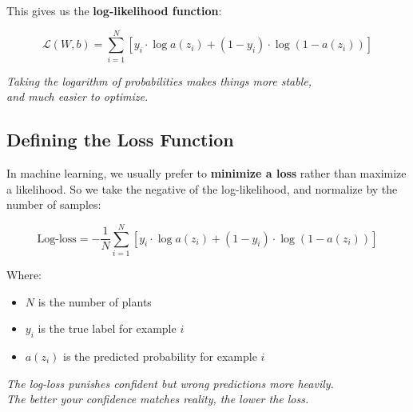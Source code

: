 \documentclass[11pt]{article}
\begin{document}
\vspace{0.5em}

This gives us the \textbf{log-likelihood function}:

\[
\mathcal{L}(W, b) = \sum_{i=1}^{N} \left[ y_i \cdot \log a(z_i) + (1 - y_i) \cdot \log (1 - a(z_i)) \right]
\]

\vspace{0.5em}

\begin{tcolorbox}[colback=gray!8, colframe=gray!40!black, sharp corners=southwest, boxrule=0.3mm]
\centering
\textit{Taking the logarithm of probabilities makes things more stable,}\\
\textit{and much easier to optimize.}
\end{tcolorbox}

\vspace{1.5em}

\subsection*{Defining the Loss Function}

In machine learning, we usually prefer to \textbf{minimize a loss} rather than maximize a likelihood.  
So we take the negative of the log-likelihood, and normalize by the number of samples:

\[
\text{Log-loss} = -\frac{1}{N} \sum_{i=1}^{N} \left[ y_i \cdot \log a(z_i) + (1 - y_i) \cdot \log (1 - a(z_i)) \right]
\]

\vspace{0.5em}

Where:
\begin{itemize}
    \item $N$ is the number of plants
    \item $y_i$ is the true label for example $i$
    \item $a(z_i)$ is the predicted probability for example $i$
\end{itemize}

\vspace{0.5em}

\begin{tcolorbox}[colback=gray!8, colframe=gray!40!black, sharp corners=southwest, boxrule=0.3mm]
\centering
\textit{The log-loss punishes confident but wrong predictions more heavily.}\\
\textit{The better your confidence matches reality, the lower the loss.}
\end{tcolorbox}
\end{document}

